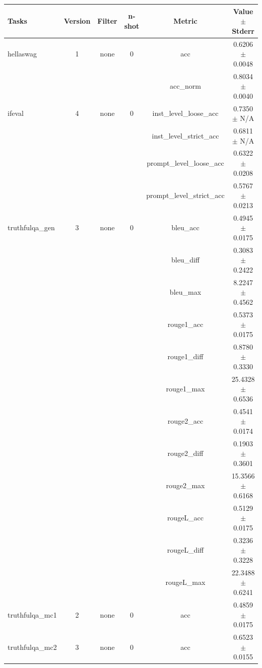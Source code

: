 \documentclass{ifacconf}
\begin{document}
	\vfill
	\clearpage
	\pagebreak
	
	\begin{strip}
		\begin{minipage}{\textwidth}
			\begin{table}[H]
				\centering
				\begin{tabular}{|l|c|c|c|c|c|}
					\hline
					\textbf{Tasks} & \textbf{Version} & \textbf{Filter} & \textbf{n-shot} & \textbf{Metric} & \textbf{Value} $\pm$ \textbf{Stderr} \\ \hline
					hellaswag & 1 & none & 0 & acc & 0.6206 $\pm$ 0.0048 \\ \hline
					& & & & acc\_norm & 0.8034 $\pm$ 0.0040 \\ \hline
					ifeval & 4 & none & 0 & inst\_level\_loose\_acc & 0.7350 $\pm$ N/A \\ \hline
					& & & & inst\_level\_strict\_acc & 0.6811 $\pm$ N/A \\ \hline
					& & & & prompt\_level\_loose\_acc & 0.6322 $\pm$ 0.0208 \\ \hline
					& & & & prompt\_level\_strict\_acc & 0.5767 $\pm$ 0.0213 \\ \hline
					truthfulqa\_gen & 3 & none & 0 & bleu\_acc & 0.4945 $\pm$ 0.0175 \\ \hline
					& & & & bleu\_diff & 0.3083 $\pm$ 0.2422 \\ \hline
					& & & & bleu\_max & 8.2247 $\pm$ 0.4562 \\ \hline
					& & & & rouge1\_acc & 0.5373 $\pm$ 0.0175 \\ \hline
					& & & & rouge1\_diff & 0.8780 $\pm$ 0.3330 \\ \hline
					& & & & rouge1\_max & 25.4328 $\pm$ 0.6536 \\ \hline
					& & & & rouge2\_acc & 0.4541 $\pm$ 0.0174 \\ \hline
					& & & & rouge2\_diff & 0.1903 $\pm$ 0.3601 \\ \hline
					& & & & rouge2\_max & 15.3566 $\pm$ 0.6168 \\ \hline
					& & & & rougeL\_acc & 0.5129 $\pm$ 0.0175 \\ \hline
					& & & & rougeL\_diff & 0.3236 $\pm$ 0.3228 \\ \hline
					& & & & rougeL\_max & 22.3488 $\pm$ 0.6241 \\ \hline
					truthfulqa\_mc1 & 2 & none & 0 & acc & 0.4859 $\pm$ 0.0175 \\ \hline
					truthfulqa\_mc2 & 3 & none & 0 & acc & 0.6523 $\pm$ 0.0155 \\ \hline
				\end{tabular}
				\label{tab:qwen25_q6k}
			\end{table}
			

\end{minipage}
\end{strip}
\end{document}
